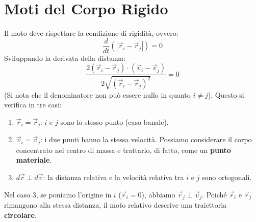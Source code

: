 \section{Moti del Corpo Rigido}
Il moto deve rispettare la condizione di rigidità, ovvero:
\begin{equation}
    \frac{d}{dt} \left( |\vec{r}_i - \vec{r}_j| \right) = 0
\end{equation}
Sviluppando la derivata della distanza:
\begin{equation}
    \frac{2(\vec{r}_i - \vec{r}_j) \cdot (\vec{v}_i - \vec{v}_j)}{2\sqrt{(\vec{r}_i - \vec{r}_j)^2}} = 0
\end{equation}
(Si nota che il denominatore non può essere nullo in quanto $i \neq j$).
Questo si verifica in tre casi:
\begin{enumerate}
    \item $\vec{r}_i = \vec{r}_j$: $i$ e $j$ sono lo stesso punto (caso banale).
    \item $\vec{v}_i = \vec{v}_j$: i due punti hanno la stessa velocità. Possiamo considerare il corpo concentrato nel centro di massa e trattarlo, di fatto, come un \textbf{punto materiale}.
    \item $d\vec{r} \perp d\vec{v}$: la distanza relativa e la velocità relativa tra $i$ e $j$ sono ortogonali.
\end{enumerate}
Nel caso 3, se poniamo l'origine in $i$ ($\vec{r}_i = 0$), abbiamo $\vec{r}_j \perp \vec{v}_j$. Poiché $\vec{r}_i$ e $\vec{r}_j$ rimangono alla stessa distanza, il moto relativo descrive una traiettoria \textbf{circolare}.

